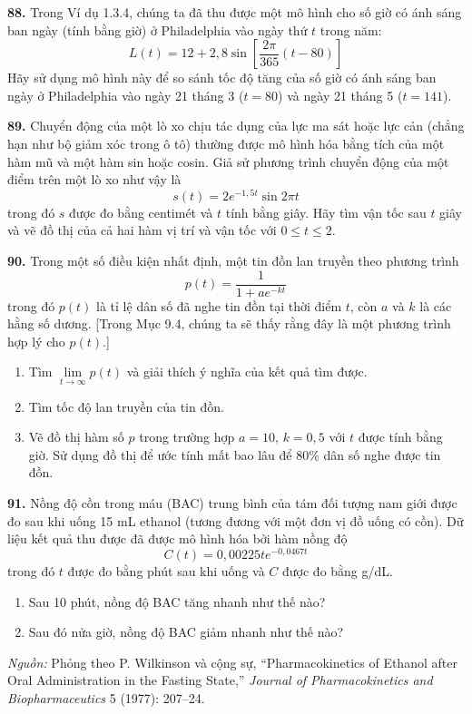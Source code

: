 \noindent
\begin{minipage}[t]{0.485\textwidth}
\textbf{88.} Trong Ví dụ 1.3.4, chúng ta đã thu được một mô hình cho số giờ có ánh sáng ban ngày (tính bằng giờ) ở Philadelphia vào ngày thứ $t$ trong năm:
\[
L(t) = 12 + 2{,}8 \sin\left[ \frac{2\pi}{365}(t - 80) \right]
\]
Hãy sử dụng mô hình này để so sánh tốc độ tăng của số giờ có ánh sáng ban ngày ở Philadelphia vào ngày 21 tháng 3 ($t = 80$) và ngày 21 tháng 5 ($t = 141$).

\vspace{8pt}
\noindent
\llap{\graphicon\enspace}\textbf{89.} Chuyển động của một lò xo chịu tác dụng của lực ma sát hoặc lực cản (chẳng hạn như bộ giảm xóc trong ô tô) thường được mô hình hóa bằng tích của một hàm mũ và một hàm sin hoặc cosin. Giả sử phương trình chuyển động của một điểm trên một lò xo như vậy là
\[
s(t) = 2e^{-1{,}5t} \sin 2\pi t
\]
trong đó $s$ được đo bằng centimét và $t$ tính bằng giây. Hãy tìm vận tốc sau $t$ giây và vẽ đồ thị của cả hai hàm vị trí và vận tốc với $0 \leqslant t \leqslant 2$.

\vspace{8pt}
\noindent
\textbf{90.} Trong một số điều kiện nhất định, một tin đồn lan truyền theo phương trình
\[
p(t) = \frac{1}{1 + ae^{-kt}}
\]
trong đó $p(t)$ là tỉ lệ dân số đã nghe tin đồn tại thời điểm $t$, còn $a$ và $k$ là các hằng số dương. [Trong Mục 9.4, chúng ta sẽ thấy rằng đây là một phương trình hợp lý cho $p(t)$.]
\begin{enumerate}[label=(\alph*), leftmargin=*, itemsep=1pt, topsep=2pt]
  \item Tìm $\lim\limits_{t \to \infty} p(t)$ và giải thích ý nghĩa của kết quả tìm được.
  \item Tìm tốc độ lan truyền của tin đồn.
  \item[\llap{\graphicon\enspace}(c)] Vẽ đồ thị hàm số $p$ trong trường hợp $a = 10$, $k = 0{,}5$ với $t$ được tính bằng giờ. Sử dụng đồ thị để ước tính mất bao lâu để 80\% dân số nghe được tin đồn.
\end{enumerate}

\vspace{8pt}
\noindent
\textbf{91.} Nồng độ cồn trong máu (BAC) trung bình của tám đối tượng nam giới được đo sau khi uống 15 mL ethanol (tương đương với một đơn vị đồ uống có cồn). Dữ liệu kết quả thu được đã được mô hình hóa bởi hàm nồng độ
\[
C(t) = 0{,}00225te^{-0{,}0467t}
\]
trong đó $t$ được đo bằng phút sau khi uống và $C$ được đo bằng g/dL.
\begin{enumerate}[label=(\alph*), leftmargin=*, itemsep=1pt, topsep=2pt]
  \item Sau 10 phút, nồng độ BAC tăng nhanh như thế nào?
  \item Sau đó nửa giờ, nồng độ BAC giảm nhanh như thế nào?
\end{enumerate}
\vspace{2pt}
{\footnotesize \textit{Nguồn:} Phỏng theo P. Wilkinson và cộng sự, “Pharmacokinetics of Ethanol after Oral Administration in the Fasting State,” \textit{Journal of Pharmacokinetics and Biopharmaceutics} 5 (1977): 207--24.}


\end{minipage}
